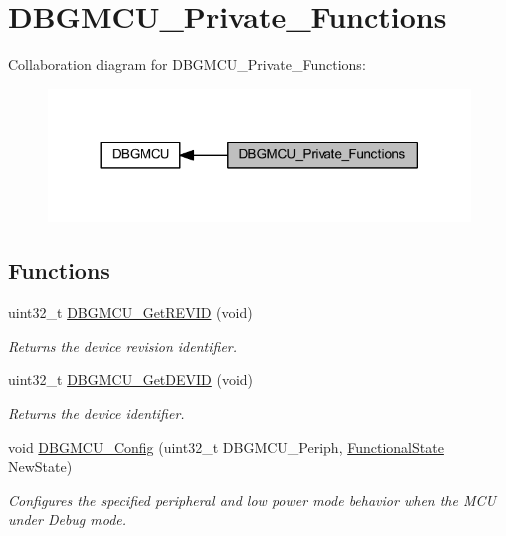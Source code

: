 \hypertarget{group___d_b_g_m_c_u___private___functions}{}\section{D\+B\+G\+M\+C\+U\+\_\+\+Private\+\_\+\+Functions}
\label{group___d_b_g_m_c_u___private___functions}
Collaboration diagram for D\+B\+G\+M\+C\+U\+\_\+\+Private\+\_\+\+Functions\+:
\nopagebreak
\begin{figure}[H]
\begin{center}
\leavevmode
\includegraphics[width=317pt]{group___d_b_g_m_c_u___private___functions}
\end{center}
\end{figure}
\subsection*{Functions}
\begin{DoxyCompactItemize}
\item 
uint32\+\_\+t \hyperlink{group___d_b_g_m_c_u___private___functions_ga47419e9ca75ab7be4c70feb82faa0511}{D\+B\+G\+M\+C\+U\+\_\+\+Get\+R\+E\+V\+ID} (void)
\begin{DoxyCompactList}\small\item\em Returns the device revision identifier. \end{DoxyCompactList}\item 
uint32\+\_\+t \hyperlink{group___d_b_g_m_c_u___private___functions_gac34193c34dbce759bf424957a31b3266}{D\+B\+G\+M\+C\+U\+\_\+\+Get\+D\+E\+V\+ID} (void)
\begin{DoxyCompactList}\small\item\em Returns the device identifier. \end{DoxyCompactList}\item 
void \hyperlink{group___d_b_g_m_c_u___private___functions_gadf2f267f855ac1e4c03905c5dcfbd28b}{D\+B\+G\+M\+C\+U\+\_\+\+Config} (uint32\+\_\+t D\+B\+G\+M\+C\+U\+\_\+\+Periph, \hyperlink{group___exported__types_gac9a7e9a35d2513ec15c3b537aaa4fba1}{Functional\+State} New\+State)
\begin{DoxyCompactList}\small\item\em Configures the specified peripheral and low power mode behavior when the M\+CU under Debug mode. \end{DoxyCompactList}\end{DoxyCompactItemize}


